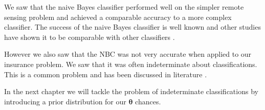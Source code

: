 We saw that the naive Bayes classifier performed well on the simpler remote sensing problem and achieved a comparable accuracy to a more complex classifier.
The success of the naive Bayes classifier is well known and other studies have shown it to be comparable with other classifiers \cite{Dumitru09}.

However we also saw that the NBC was not very accurate when applied to our insurance problem.
We saw that it was often indeterminate about classifications.
This is a common problem and has been discussed in literature \cite{Chen96}.

In the next chapter we will tackle the problem of indeterminate classifications by introducing a prior distribution for our $\mathbf{\theta}$ chances.